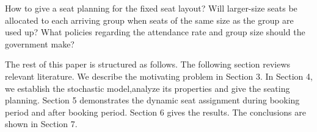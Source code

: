 How to give a seat planning for the fixed seat layout? Will larger-size seats be allocated to each arriving group when seats of the same size as the group are used up? What policies regarding the attendance rate and group size should the government make?




The rest of this paper is structured as follows. The following section reviews relevant literature. We describe the motivating problem in Section 3. In Section 4, we establish the stochastic model,analyze its properties and give the seating planning. Section 5 demonstrates the dynamic seat assignment during booking period and after booking period. Section 6 gives the results. The conclusions are shown in Section 7.



\newpage
